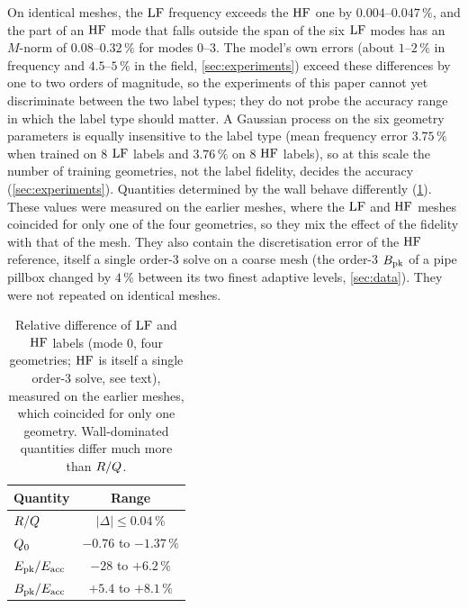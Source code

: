 On identical meshes, the $\mathrm{LF}$ frequency exceeds the $\mathrm{HF}$ one by $0.004$--$0.047\,\%$, and the part of an $\mathrm{HF}$
mode that falls outside the span of the six $\mathrm{LF}$ modes has an $M$-norm of $0.08$--$0.32\,\%$ for modes 0--3. The
model's own errors (about $1$--$2\,\%$ in frequency and $4.5$--$5\,\%$ in the field, \cref{sec:experiments}) exceed
these differences by one to two orders of magnitude, so the experiments of this paper cannot yet discriminate between
the two label types; they do not probe the accuracy range in which the label type should matter. A Gaussian process on the six geometry
parameters is equally insensitive to the label type (mean frequency error $3.75\,\%$ when trained on 8 $\mathrm{LF}$ labels and
$3.76\,\%$ on 8 $\mathrm{HF}$ labels), so at this scale the number of training geometries, not the label fidelity, decides
the accuracy (\cref{sec:experiments}).
Quantities determined by the wall behave differently (\cref{tab:06-diff}). These values were measured on the earlier
meshes, where the $\mathrm{LF}$ and $\mathrm{HF}$ meshes coincided for only one of the four geometries, so they mix the effect of the
fidelity with that of the mesh. They also contain the discretisation error of the $\mathrm{HF}$ reference, itself a single
order-3 solve on a coarse mesh (the order-3 $\Bpk$ of a pipe pillbox changed by $4\,\%$ between its two finest
adaptive levels, \cref{sec:data}). They were not repeated on identical meshes.

\begin{table}[t]
\centering
\caption{Relative difference of $\mathrm{LF}$ and $\mathrm{HF}$ labels (mode 0, four geometries; $\mathrm{HF}$ is itself a single order-3 solve,
see text), measured on the earlier meshes, which coincided for only one geometry. Wall-dominated quantities differ
much more than $R/Q$.}
\label{tab:06-diff}
\small
\begin{tabular}{@{}lc@{}}
\toprule
Quantity & Range \\
\midrule
$R/Q$ & $|\Delta|\le 0.04\,\%$ \\ %
$\Qz$ & $-0.76$ to $-1.37\,\%$ \\ %
$\Epk/\Eacc$ & $-28$ to $+6.2\,\%$ \\ %
$\Bpk/\Eacc$ & $+5.4$ to $+8.1\,\%$ \\ %
\bottomrule
\end{tabular}
\end{table}

